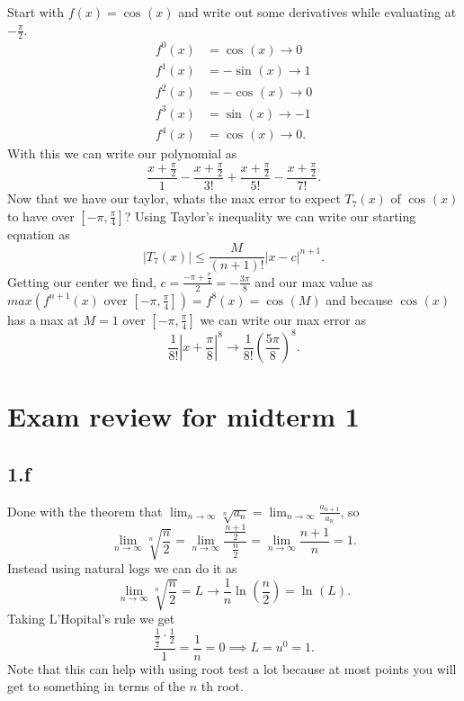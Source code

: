 {
	Start with $ f\left( x \right) =\cos^{  } \left( x \right)  $ and write out some derivatives while evaluating at $ -\frac{ \pi }{ 2 }  $.
	\begin{align*}
		f^{ 0 }\left( x \right) &=\cos^{  } \left( x \right) \to 0 \\
		f^{ 1 }\left( x \right) &= -\sin^{  } \left( x \right) \to 1 \\
		f^{ 2 }\left( x \right) &=-\cos^{  } \left( x \right) \to 0 \\
		f^{ 3 }\left( x \right) &= \sin^{  } \left( x \right) \to -1 \\
		f^{ 4 }\left( x \right) &= \cos^{  } \left( x \right) \to 0
	.\end{align*}
	With this we can write our polynomial as
	\[
	\frac{ x+\frac{ \pi }{ 2 }  }{ 1 }-\frac{ x+\frac{ \pi }{ 2 }  }{ 3! }+\frac{ x+\frac{ \pi }{ 2 }  }{ 5! }-\frac{ x+\frac{ \pi }{ 2 }  }{ 7! }
	.\] 
	Now that we have our taylor, whats the max error to expect $ T_7\left( x \right)  $ of $ \cos^{  } \left( x \right)  $ to have over $ \left[ -\pi ,\frac{ \pi }{ 4 }  \right]  $?
	Using Taylor's inequality we can write our starting equation as
	\[
	\left| T_7\left( x \right)  \right|\le \frac{ M }{ \left( n+1 \right) ! } \left| x-c \right|^{ n+1 }
	.\] 
	Getting our center we find, $ c= \frac{ -\pi + \frac{ \pi }{ 4 }  }{ 2 } = -\frac{ 3\pi }{ 8 }  $ and our max value as $ max\left( f^{ n+1 }\left( x \right) \text{ over } \left[ -\pi , \frac{ \pi }{ 4 }  \right] \right) = f^{ 8 }\left( x \right) =\cos^{  } \left( M \right)  $ and because $ \cos^{  } \left( x \right)  $ has a max at $ M=1 $ over $ \left[ -\pi , \frac{ \pi }{ 4 }  \right]  $ we can write our max error as
	\[
	\frac{ 1 }{ 8! } \left| x+\frac{ \pi }{ 8 }  \right|^{ 8 } \to \frac{ 1 }{ 8! } \left( \frac{ 5\pi }{ 8 }   \right) ^{ 8 }
	.\] 

} 
\section*{Exam review for midterm 1}%
\label{sec:Exam review for midterm 1}
\subsection*{1.f}%
\label{sub:1.f}
Done with the theorem that $ \lim_{ n \to \infty} \sqrt[ n ]{ a_n } = \lim_{ n \to \infty} \frac{ a_{ n+1 } }{ a_n } $, so
\[
\lim_{ n \to \infty} \sqrt[ n ]{ \frac{ n }{ 2 }  } = \lim_{ n \to \infty} \frac{ \frac{ n+1 }{ 2 } }{ \frac{ n }{ 2 }  }= \lim_{ n \to \infty} \frac{ n+1 }{ n }=1
.\] 
Instead using natural logs we can do it as
\[
\lim_{ n \to \infty} \sqrt[ n ]{ \frac{ n }{ 2 }  } = L \to \frac{ 1 }{ n } \ln^{  } \left( \frac{ n }{ 2 }  \right) =\ln^{  } \left( L \right) 
.\] 
Taking L'Hopital's rule we get
\[
\frac{ \frac{ 1 }{ \frac{ n }{ 2 } } \cdot \frac{ 1 }{ 2 }  }{ 1 } = \frac{ 1 }{ n } = 0 \implies L = u ^{ 0 }=1
.\] 
Note that this can help with using root test a lot because at most points you will get to something in terms of the $ n $ th root. 

